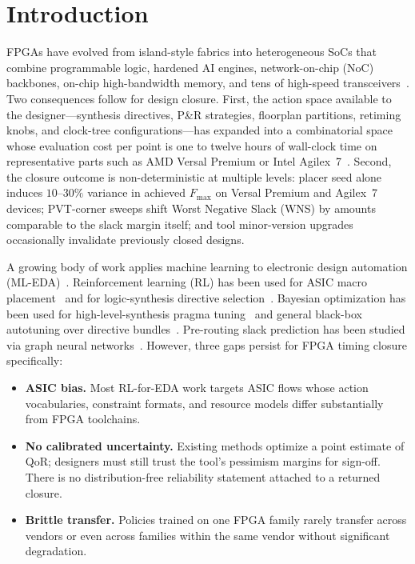 \documentclass[journal,onecolumn=false]{IEEEtran}
\begin{document}
\section{Introduction}
 FPGAs have evolved from island-style fabrics into heterogeneous SoCs that combine programmable logic, hardened AI engines, network-on-chip (NoC) backbones, on-chip high-bandwidth memory, and tens of high-speed transceivers~\cite{boutros2021fpga}. Two consequences follow for design closure. First, the action space available to the designer---synthesis directives, P\&R strategies, floorplan partitions, retiming knobs, and clock-tree configurations---has expanded into a combinatorial space whose evaluation cost per point is one to twelve hours of wall-clock time on representative parts such as AMD Versal Premium or Intel Agilex~7~\cite{amd_ug1273,intel_ug20156}. Second, the closure outcome is non-deterministic at multiple levels: placer seed alone induces $10$--$30\%$ variance in achieved $F_{\max}$ on Versal Premium and Agilex~7 devices; PVT-corner sweeps shift Worst Negative Slack (WNS) by amounts comparable to the slack margin itself; and tool minor-version upgrades occasionally invalidate previously closed designs.

A growing body of work applies machine learning to electronic design automation (ML-EDA)~\cite{huang2021mleda,ren2022mleda}. Reinforcement learning (RL) has been used for ASIC macro placement~\cite{mirhoseini2021nature,agnesina2023autodmp} and for logic-synthesis directive selection~\cite{hosny2020drills,wang2020gcnrl}. Bayesian optimization has been used for high-level-synthesis pragma tuning~\cite{sohrabizadeh2022autodse} and general black-box autotuning over directive bundles~\cite{eriksson2019turbo,balandat2020botorch}. Pre-routing slack prediction has been studied via graph neural networks~\cite{barboza2019net2,guo2022timing}. However, three gaps persist for FPGA timing closure specifically:
\begin{itemize}
  \item \textbf{ASIC bias.} Most RL-for-EDA work targets ASIC flows whose action vocabularies, constraint formats, and resource models differ substantially from FPGA toolchains.
  \item \textbf{No calibrated uncertainty.} Existing methods optimize a point estimate of QoR; designers must still trust the tool's pessimism margins for sign-off. There is no distribution-free reliability statement attached to a returned closure.
  \item \textbf{Brittle transfer.} Policies trained on one FPGA family rarely transfer across vendors or even across families within the same vendor without significant degradation.
\end{itemize}
\end{document}

